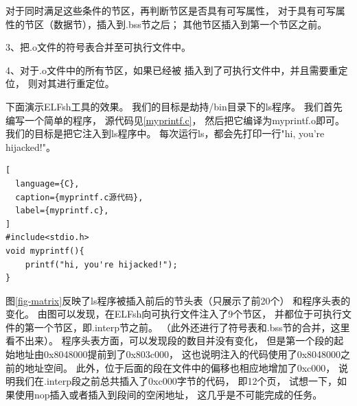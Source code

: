 对于同时满足这些条件的节区，再判断节区是否具有可写属性，
对于具有可写属性的节区（数据节），插入到.bss节之后；
其他节区插入到第一个节区之前。

3、把.o文件的符号表合并至可执行文件中。

4、对于.o文件中的所有节区，如果已经被
插入到了可执行文件中，并且需要重定位，
则对其进行重定位。

下面演示ELFsh工具的效果。
我们的目标是劫持/bin目录下的ls程序。
我们首先编写一个简单的程序，
源代码见\ref{myprintf.c}，
然后把它编译为myprintf.o即可。
我们的目标是把它注入到ls程序中。
每次运行ls，都会先打印一行"hi, you're hijacked!"。

\begin{lstlisting}[
  language={C},
  caption={myprintf.c源代码},
  label={myprintf.c},
]
#include<stdio.h>
void myprintf(){
    printf("hi, you're hijacked!");
}
\end{lstlisting}

图\ref{fig-matrix}反映了ls程序被插入前后的节头表（只展示了前20个）
和程序头表的变化。
由图可以发现，在ELFsh向可执行文件注入了9个节区，
并都位于可执行文件的第一个节区，即.interp节之前。
（此外还进行了符号表和.bss节的合并，这里看不出来）。
程序头表方面，可以发现段的数目并没有变化，
但是第一个段的起始地址由0x8048000提前到了0x803c000，
这也说明注入的代码使用了0x8048000之前的地址空间。
此外，位于后面的段在文件中的偏移也相应地增加了0xc000，
说明我们在.interp段之前总共插入了0xc000字节的代码，
即12个页，
试想一下，如果使用nop插入或者插入到段间的空闲地址，
这几乎是不可能完成的任务。

